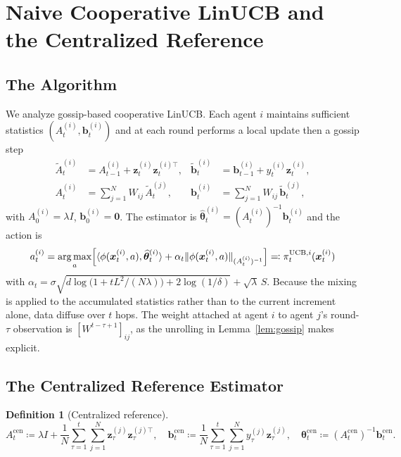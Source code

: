 \documentclass[11pt]{article}
\newtheorem{definition}[theorem]{Definition}
\DeclareMathOperator*{\argmax}{arg\,max}
\begin{document}
\section{Naive Cooperative LinUCB and the Centralized Reference}
\label{sec:naive}

\subsection{The Algorithm}

We analyze gossip-based cooperative LinUCB.  Each agent $i$ maintains
sufficient statistics $(A_t^{(i)},\bm{b}_t^{(i)})$ and at each round
performs a local update then a gossip step \begin{align*}
\widetilde{A}_t^{(i)}&=A_{t-1}^{(i)}+\bm{z}_t^{(i)}\bm{z}_t^{(i)\top},&
\widetilde{\bm{b}}_t^{(i)}&=\bm{b}_{t-1}^{(i)}+y_t^{(i)}\bm{z}_t^{(i)},\\
A_t^{(i)}&=\sum_{j=1}^N W_{ij}\,\widetilde{A}_t^{(j)},&
\bm{b}_t^{(i)}&=\sum_{j=1}^N W_{ij}\,\widetilde{\bm{b}}_t^{(j)},
\end{align*}
with $A_0^{(i)}=\lambda I$, $\bm{b}_0^{(i)}=\bm{0}$.
The estimator is
$\widehat{\bm{\theta}}_t^{(i)}=(A_t^{(i)})^{-1}\bm{b}_t^{(i)}$
and the action is
\[
a_t^{(i)}=\argmax_a\Bigl[\langle\phi(\bm{x}_t^{(i)},a),
\widehat{\bm{\theta}}_t^{(i)}\rangle
+\alpha_t\|\phi(\bm{x}_t^{(i)},a)\|_{(A_t^{(i)})^{-1}}\Bigr]
\eqqcolon\pi_t^{\mathrm{UCB},i}(\bm{x}_t^{(i)})
\]
with $\alpha_t=\sigma\sqrt{d\log\!\bigl(1+tL^2/(N\lambda)\bigr)+2\log(1/\delta)}
+\sqrt{\lambda}\,S$.
Because the mixing is applied to the accumulated statistics rather
than to the current increment alone, data diffuse over $t$ hops. The
weight attached at agent $i$ to agent $j$'s round-$\tau$ observation
is $[W^{t-\tau+1}]_{ij}$, as the unrolling in Lemma~\ref{lem:gossip}
makes explicit.

\subsection{The Centralized Reference Estimator}

\begin{definition}[Centralized reference]\label{def:cen}
\[
A_t^{\mathrm{cen}}\coloneqq\lambda I+\frac{1}{N}\sum_{\tau=1}^t\sum_{j=1}^N
\bm{z}_\tau^{(j)}\bm{z}_\tau^{(j)\top},\quad
\bm{b}_t^{\mathrm{cen}}\coloneqq\frac{1}{N}\sum_{\tau=1}^t\sum_{j=1}^N
y_\tau^{(j)}\bm{z}_\tau^{(j)},\quad
\bm{\theta}_t^{\mathrm{cen}}\coloneqq(A_t^{\mathrm{cen}})^{-1}\bm{b}_t^{\mathrm{cen}}.
\]
\end{definition}
\end{document}
